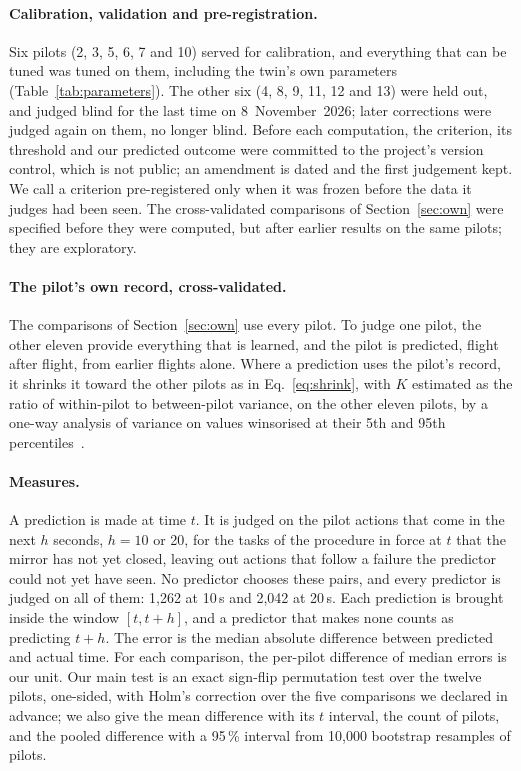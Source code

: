 \documentclass{llncs}
\begin{document}
\paragraph{Calibration, validation and pre-registration.} Six pilots (2, 3, 5, 6, 7 and 10) served for calibration, and everything that
can be tuned was tuned on them, including the twin's own parameters (Table~\ref{tab:parameters}). The other six (4, 8, 9, 11, 12 and 13)
were held out, and judged blind for the last time on 8~November~2026; later corrections were judged again on them, no longer blind.
Before each computation, the criterion, its threshold and our predicted outcome were committed to the project's version control, which
is not public; an amendment is dated and the first judgement kept. We call a criterion pre-registered only when it was frozen before the
data it judges had been seen. The cross-validated comparisons of Section~\ref{sec:own} were specified before they were computed, but
after earlier results on the same pilots; they are exploratory.

\paragraph{The pilot's own record, cross-validated.} The comparisons of Section~\ref{sec:own} use every pilot. To judge one pilot, the
other eleven provide everything that is learned, and the pilot is predicted, flight after flight, from earlier flights alone. Where a
prediction uses the pilot's record, it shrinks it toward the other pilots as in Eq.~\ref{eq:shrink}, with $K$ estimated as the ratio of
within-pilot to between-pilot variance, on the other eleven pilots, by a one-way analysis of variance on values winsorised at their 5th
and 95th percentiles~\cite{efron_morris_1975}.

\paragraph{Measures.} A prediction is made at time $t$. It is judged on the pilot actions that come in the next $h$ seconds, $h = 10$ or
20, for the tasks of the procedure in force at $t$ that the mirror has not yet closed, leaving out actions that follow a failure the
predictor could not yet have seen. No predictor chooses these pairs, and every predictor is judged on all of them: 1,262 at 10\,s and
2,042 at 20\,s. Each prediction is brought inside the window $[t, t + h]$, and a predictor that makes none counts as predicting $t + h$.
The error is the median absolute difference between predicted and actual time. For each comparison, the per-pilot difference of median
errors is our unit. Our main test is an exact sign-flip permutation test over the twelve pilots, one-sided,
with Holm's correction over the five comparisons we declared in advance; we also give the mean difference with its $t$ interval, the
count of pilots, and the pooled difference with a 95\,\% interval from 10,000 bootstrap resamples of pilots.
\end{document}

